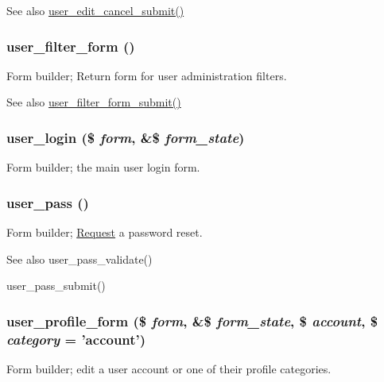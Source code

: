 \begin{DoxySeeAlso}{See also}
\hyperlink{user_8pages_8inc_a6912a7bb727cd64eb073d3cd1de643b0}{user\_\-edit\_\-cancel\_\-submit()} 
\end{DoxySeeAlso}
\hypertarget{group__forms_ga4492f8566743ff967248ff7d22108a54}{
\subsubsection[{user\_\-filter\_\-form}]{\setlength{\rightskip}{0pt plus 5cm}user\_\-filter\_\-form ()}}
\label{group__forms_ga4492f8566743ff967248ff7d22108a54}
Form builder; Return form for user administration filters.

\begin{DoxySeeAlso}{See also}
\hyperlink{user_8admin_8inc_aedf12621a6f405cf3032a9319771b4e1}{user\_\-filter\_\-form\_\-submit()} 
\end{DoxySeeAlso}
\hypertarget{group__forms_gac2d24ff71cebbfa81b8324ac1d9edfe2}{
\subsubsection[{user\_\-login}]{\setlength{\rightskip}{0pt plus 5cm}user\_\-login (\$ {\em form}, \/  \&\$ {\em form\_\-state})}}
\label{group__forms_gac2d24ff71cebbfa81b8324ac1d9edfe2}
Form builder; the main user login form. \hypertarget{group__forms_gad7f952e136ebcff493ca8de7209100cf}{
\subsubsection[{user\_\-pass}]{\setlength{\rightskip}{0pt plus 5cm}user\_\-pass ()}}
\label{group__forms_gad7f952e136ebcff493ca8de7209100cf}
Form builder; \hyperlink{classRequest}{Request} a password reset.

\begin{DoxySeeAlso}{See also}
user\_\-pass\_\-validate() 

user\_\-pass\_\-submit() 
\end{DoxySeeAlso}
\hypertarget{group__forms_ga600bbf7cf395cbfedae1c3bc33727346}{
\subsubsection[{user\_\-profile\_\-form}]{\setlength{\rightskip}{0pt plus 5cm}user\_\-profile\_\-form (\$ {\em form}, \/  \&\$ {\em form\_\-state}, \/  \$ {\em account}, \/  \$ {\em category} = {\ttfamily 'account'})}}
\label{group__forms_ga600bbf7cf395cbfedae1c3bc33727346}
Form builder; edit a user account or one of their profile categories.

